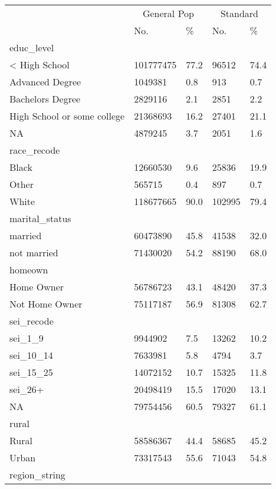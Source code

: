 \captionsetup[table]{labelformat=empty,skip=1pt}
\begin{longtable}{lllll}
\toprule
& \multicolumn{2}{c}{General Pop} & \multicolumn{2}{c}{Standard} \\ 
 \cmidrule(lr){2-3}\cmidrule(lr){4-5}
 & No. & \% & No. & \% \\ 
\midrule
\multicolumn{1}{l}{educ\_level} \\ 
\midrule
< High School & 101777475 & 77.2 & 96512 & 74.4 \\ 
Advanced Degree & 1049381 & 0.8 & 913 & 0.7 \\ 
Bachelors Degree & 2829116 & 2.1 & 2851 & 2.2 \\ 
High School or some college & 21368693 & 16.2 & 27401 & 21.1 \\ 
NA & 4879245 & 3.7 & 2051 & 1.6 \\ 
\midrule
\multicolumn{1}{l}{race\_recode} \\ 
\midrule
Black & 12660530 & 9.6 & 25836 & 19.9 \\ 
Other & 565715 & 0.4 & 897 & 0.7 \\ 
White & 118677665 & 90.0 & 102995 & 79.4 \\ 
\midrule
\multicolumn{1}{l}{marital\_status} \\ 
\midrule
married & 60473890 & 45.8 & 41538 & 32.0 \\ 
not married & 71430020 & 54.2 & 88190 & 68.0 \\ 
\midrule
\multicolumn{1}{l}{homeown} \\ 
\midrule
Home Owner & 56786723 & 43.1 & 48420 & 37.3 \\ 
Not Home Owner & 75117187 & 56.9 & 81308 & 62.7 \\ 
\midrule
\multicolumn{1}{l}{sei\_recode} \\ 
\midrule
sei\_1\_9 & 9944902 & 7.5 & 13262 & 10.2 \\ 
sei\_10\_14 & 7633981 & 5.8 & 4794 & 3.7 \\ 
sei\_15\_25 & 14072152 & 10.7 & 15325 & 11.8 \\ 
sei\_26+ & 20498419 & 15.5 & 17020 & 13.1 \\ 
NA & 79754456 & 60.5 & 79327 & 61.1 \\ 
\midrule
\multicolumn{1}{l}{rural} \\ 
\midrule
Rural & 58586367 & 44.4 & 58685 & 45.2 \\ 
Urban & 73317543 & 55.6 & 71043 & 54.8 \\ 
\midrule
\multicolumn{1}{l}{region\_string} \\ 

\end{longtable}
